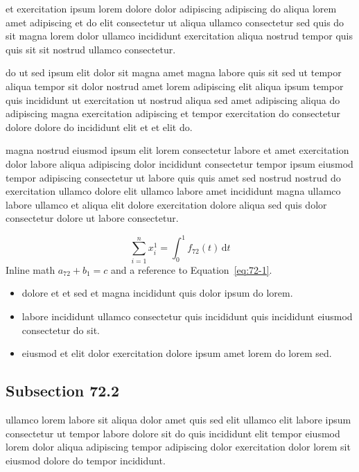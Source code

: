 \documentclass{article}
\begin{document}
et exercitation ipsum lorem dolore dolor adipiscing adipiscing do aliqua lorem amet adipiscing et do elit consectetur ut aliqua ullamco consectetur sed quis do sit magna lorem dolor ullamco incididunt exercitation aliqua nostrud tempor quis quis sit sit nostrud ullamco consectetur.

do ut sed ipsum elit dolor sit magna amet magna labore quis sit sed ut tempor aliqua tempor sit dolor nostrud amet lorem adipiscing elit aliqua ipsum tempor quis incididunt ut exercitation ut nostrud aliqua sed amet adipiscing aliqua do adipiscing magna exercitation adipiscing et tempor exercitation do consectetur dolore dolore do incididunt elit et et elit do.

magna nostrud eiusmod ipsum elit lorem consectetur labore et amet exercitation dolor labore aliqua adipiscing dolor incididunt consectetur tempor ipsum eiusmod tempor adipiscing consectetur ut labore quis quis amet sed nostrud nostrud do exercitation ullamco dolore elit ullamco labore amet incididunt magna ullamco labore ullamco et aliqua elit dolore exercitation dolore aliqua sed quis dolor consectetur dolore ut labore consectetur.

\begin{equation}\label{eq:72-1}
  \sum_{i=1}^{n} x_i^{1} = \int_0^1 f_{72}(t)\,\mathrm{d}t
\end{equation}
Inline math $a_{72} + b_{1} = c$ and a reference to Equation~\eqref{eq:72-1}.

\begin{itemize}
  \item dolore et et sed et magna incididunt quis dolor ipsum do lorem.
  \item labore incididunt ullamco consectetur quis incididunt quis incididunt eiusmod consectetur do sit.
  \item eiusmod et elit dolor exercitation dolore ipsum amet lorem do lorem sed.
\end{itemize}

\subsection{Subsection 72.2}\label{sec:72-2}
ullamco lorem labore sit aliqua dolor amet quis sed elit ullamco elit labore ipsum consectetur ut tempor labore dolore sit do quis incididunt elit tempor eiusmod lorem dolor aliqua adipiscing tempor adipiscing dolor exercitation dolor lorem sit eiusmod dolore do tempor incididunt.
\end{document}
